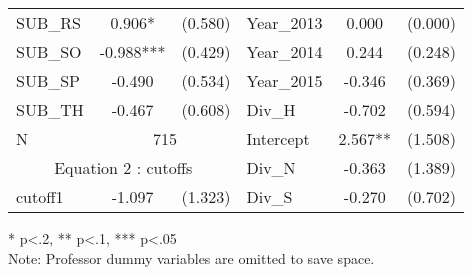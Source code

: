 \begin{table}[htb]
\begin{threeparttable}
\begin{tabular}{l c c|l c c}
    SUB\_RS                                      & 0.906*                    & (0.580)              & Year\_2013               & 0.000                  & (0.000)              \\
    SUB\_SO                                      & -0.988***                 & (0.429)              & Year\_2014               & 0.244                  & (0.248)              \\
    SUB\_SP                                      & -0.490                    & (0.534)              & Year\_2015               & -0.346                 & (0.369)              \\
    SUB\_TH                                      & -0.467                    & (0.608)              & Div\_H              & -0.702                 & (0.594)              \\
    \cline{1-3}
      N                                          & \multicolumn{2}{|c|}{715} & Intercept            & 2.567**             & (1.508)                                       \\
    \cline{1-3}
    \multicolumn{3}{c|}{Equation 2 : cutoffs}                                                     & Div\_N & -0.363                 & (1.389)                             \\
    \cline{1-3}
    cutoff1                                      & -1.097                    & (1.323)              & Div\_S              & -0.270                 & (0.702)              \\
    \hline 
    \hline
  \end{tabular}
  \begin{tablenotes}
  \item{* p<.2, ** p<.1, *** p<.05 \\ Note: Professor dummy variables are omitted to save space.}
  \end{tablenotes}
  \centering\thepage
  \end{threeparttable}
\end{table}

\clearpage{}

\newpage{}

